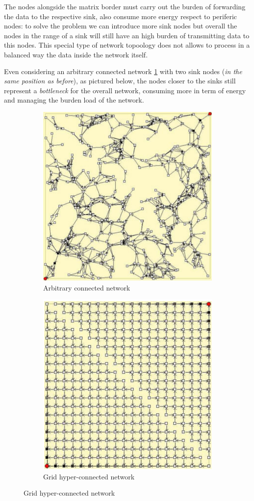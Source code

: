 \documentclass[10pt,a4paper]{report}
\theoremstyle{definition}
\begin{document}
The nodes alongside the matrix border must carry out the burden of forwarding the data to the respective sink, also consume more energy respect to periferic nodes: to solve the problem we can introduce more sink nodes but overall the nodes in the range of a sink will still have an high burden of transmitting data to this nodes.
This special type of network topoology does not allows to process in a balanced way the data inside the network itself.

Even considering an arbitrary connected network \ref{arbitrary-network} with two sink nodes (\textit{in the same position as before}), as pictured below, the nodes closer to the sinks still represent a \textit{bottleneck} for the overall network, consuming more in term of energy and managing the burden load of the network.


\begin{figure}[h]
	\centering
	\begin{subfigure}{.5\textwidth}
		\centering
		\includegraphics[width=.7\linewidth]{images/Pasted image 20230522180801.png}
		\caption{Arbitrary connected network}
		\label{arbitrary-network}
	\end{subfigure}%
	\begin{subfigure}{.5\textwidth}
		\centering
		\includegraphics[width=.7\linewidth]{images/Pasted image 20230522180206.png}
		\caption{Grid hyper-connected network}
		\label{grid-network}
	\end{subfigure}
	\label{fig:test}
\end{figure}
\end{document}
